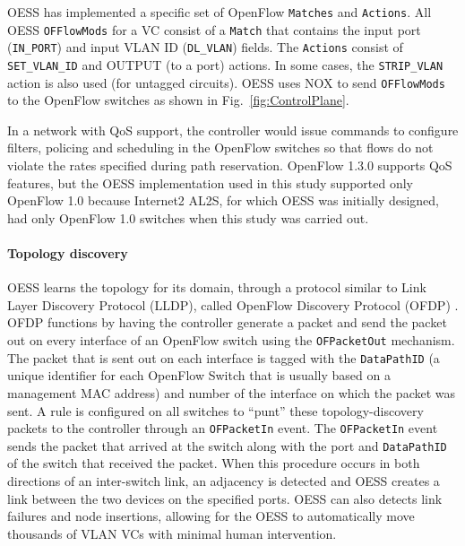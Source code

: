 OESS has implemented a specific set
of OpenFlow \texttt{Matches} and \texttt{Actions}. All OESS \texttt{OFFlowMods}
for a VC consist of a \texttt{Match} that contains the input port
(\texttt{IN\_PORT}) and input VLAN ID (\texttt{DL\_VLAN}) fields. The
\texttt{Actions} consist of \texttt{SET\_VLAN\_ID} and OUTPUT (to a port)
actions. In some cases, the \texttt{STRIP\_VLAN} action is also used
(for untagged circuits). OESS uses NOX \cite{gude2008nox} to send \texttt{OFFlowMods} to the OpenFlow switches as shown in Fig.~\ref{fig:ControlPlane}.

In a network with QoS support, the controller would issue commands to configure filters, policing and scheduling in the OpenFlow switches so that flows do not violate the rates specified during path reservation. OpenFlow 1.3.0 supports QoS features, but the OESS implementation used in this study supported only OpenFlow 1.0 because Internet2 AL2S, for which OESS was initially designed, had only OpenFlow 1.0 switches when this study was carried out.

\paragraph{Topology discovery}
OESS learns the topology for its domain,
through a protocol similar to Link Layer Discovery Protocol (LLDP), called OpenFlow Discovery Protocol (OFDP) \cite{OFDP}.
OFDP functions by having the controller generate a packet
and send the packet out on every interface of an OpenFlow
switch using the \texttt{OFPacketOut} mechanism. The packet that
is sent out on each interface is tagged with the \texttt{DataPathID}
(a unique identifier for each OpenFlow Switch that is usually
based on a management MAC address) and number of the
interface on which the packet was sent. A rule is configured on
all switches to ``punt'' these topology-discovery packets to the
controller through an \texttt{OFPacketIn} event. The \texttt{OFPacketIn}
event sends the packet that arrived at the switch along with the
port and \texttt{DataPathID} of the switch that received the packet.
When this procedure occurs in both directions of an inter-switch link, an adjacency
is detected and OESS creates a link between the two devices on
the specified ports. OESS can also detects link failures and
node insertions, allowing for the OESS to automatically move
thousands of VLAN VCs with minimal human intervention.


